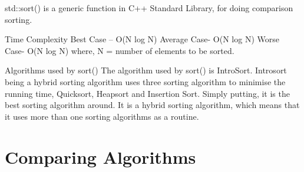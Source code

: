 \documentclass{article}
\begin{document}
std::sort() is a generic function in C++ Standard Library, for doing comparison sorting.


Time Complexity
Best Case – O(N log N)
Average Case- O(N log N)
Worse Case- O(N log N)
where, N = number of elements to be sorted.

Algorithms used by sort()
The algorithm used by sort() is IntroSort. Introsort being a hybrid sorting algorithm uses three sorting algorithm to minimise the running time, Quicksort, Heapsort and Insertion Sort. Simply putting, it is the best sorting algorithm around. It is a hybrid sorting algorithm, which means that it uses more than one sorting algorithms as a routine.




\section{Comparing Algorithms}
\end{document}
